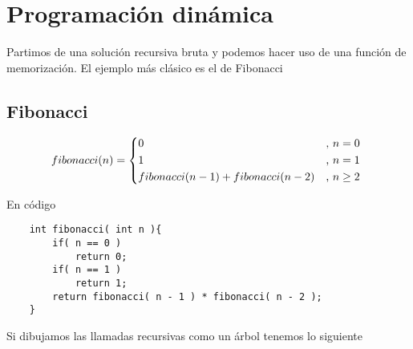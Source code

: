 \chapter{Programación dinámica}
Partimos de una solución recursiva bruta y podemos hacer uso de una función de memorización. El ejemplo más clásico es el de Fibonacci
\section{Fibonacci}
\[
    fibonacci(n) = 
    \begin{cases*}
        0 & , $n = 0$ \\    
        1 & , $n = 1$ \\
        fibonacci( n - 1 ) + fibonacci( n - 2 ) & , $ n \geq 2$ 
    \end{cases*}    
\]

En código
\begin{lstlisting}
    int fibonacci( int n ){
        if( n == 0 )
            return 0;
        if( n == 1 )
            return 1;
        return fibonacci( n - 1 ) * fibonacci( n - 2 );
    }
\end{lstlisting}

Si dibujamos las llamadas recursivas como un árbol tenemos lo siguiente 

